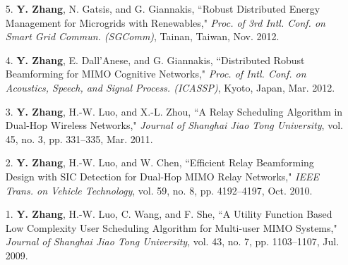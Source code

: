 \documentclass[margin,line]{res}
\begin{document}
\begin{resume}
\begin{enumerate}
\item[5.] \textbf{Y. Zhang}, N. Gatsis, and G. Giannakis,
``Robust Distributed Energy Management for Microgrids with Renewables,"
\emph{Proc. of 3rd Intl. Conf. on Smart Grid Commun. (SGComm)}, Tainan, Taiwan, Nov. 2012.

\item[4.] \textbf{Y. Zhang}, E. Dall'Anese, and G. Giannakis,
``Distributed Robust Beamforming for MIMO Cognitive Networks,"
\emph{Proc. of Intl. Conf. on Acoustics, Speech, and Signal Process. (ICASSP)}, Kyoto, Japan, Mar. 2012.

\item[3.]	\textbf{Y. Zhang}, H.-W. Luo, and X.-L. Zhou,
``A Relay Scheduling Algorithm in Dual-Hop Wireless Networks,"
\emph{Journal of Shanghai Jiao Tong University}, vol. 45, no. 3, pp. 331--335, Mar. 2011.

\item[2.]	\textbf{Y. Zhang}, H.-W. Luo, and W. Chen,
``Efficient Relay Beamforming Design with SIC Detection for Dual-Hop MIMO Relay Networks,"
\emph{IEEE Trans. on Vehicle Technology}, vol. 59, no. 8, pp. 4192--4197, Oct. 2010.

\item[1.]	\textbf{Y. Zhang}, H.-W. Luo, C. Wang, and F. She,
``A Utility Function Based Low Complexity User Scheduling Algorithm for Multi-user MIMO Systems,"
\emph{Journal of Shanghai Jiao Tong University}, vol. 43, no. 7, pp. 1103--1107, Jul. 2009.


\end{enumerate}





%
%
%
%
%
%
%
%
%
%
%
%


\end{resume}
\end{document}
